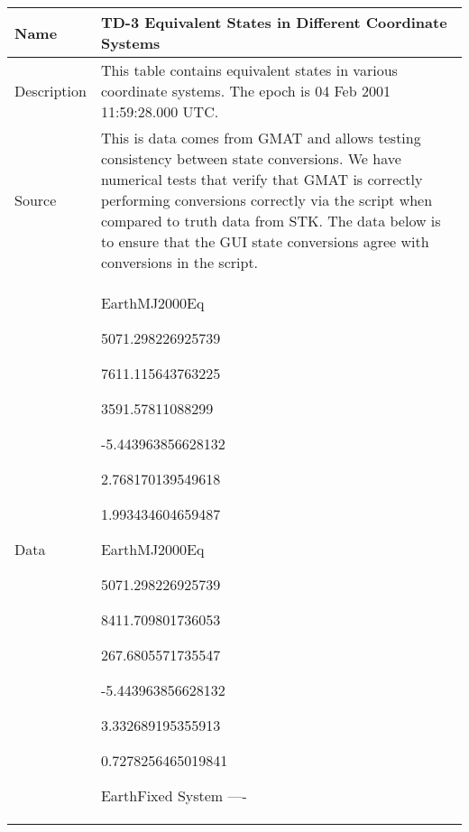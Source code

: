 \clearpage
\begin{table}[htbp!]
\centering
      \begin{tabular}{|p{1.0 in} |p{5.0 in} |}
         \hline
          \rowcolor[rgb]{0.8,0.8,0.8}  Name & TD-3 Equivalent States in Different Coordinate Systems\\
         \hline
         Description & This table contains equivalent states in various coordinate systems.
          The epoch is 04 Feb 2001 11:59:28.000 UTC.    \\ \hline
         Source &  This is data comes from GMAT and allows testing consistency between state conversions.  We have numerical tests
         that verify that GMAT is correctly performing conversions correctly via the script when compared to
         truth data from STK.  The data below is to ensure that the GUI state conversions agree with conversions in the script. \\
         \hline
         Data & \small
          \begin{compactenum}
              \item       EarthMJ2000Eq
              \begin{compactenum}
                    \item  5071.298226925739
                    \item  7611.115643763225
                     \item 3591.57811088299
                     \item -5.443963856628132
                     \item 2.768170139549618
                     \item 1.993434604659487
              \end{compactenum}
              \item EarthMJ2000Eq
              \begin{compactenum}
                     \item 5071.298226925739
                     \item 8411.709801736053
                     \item 267.6805571735547
                     \item -5.443963856628132
                     \item 3.332689195355913
                     \item 0.7278256465019841
              \end{compactenum}
              \item EarthFixed System ----

\end{compactenum}
\end{tabular}
\end{table}
